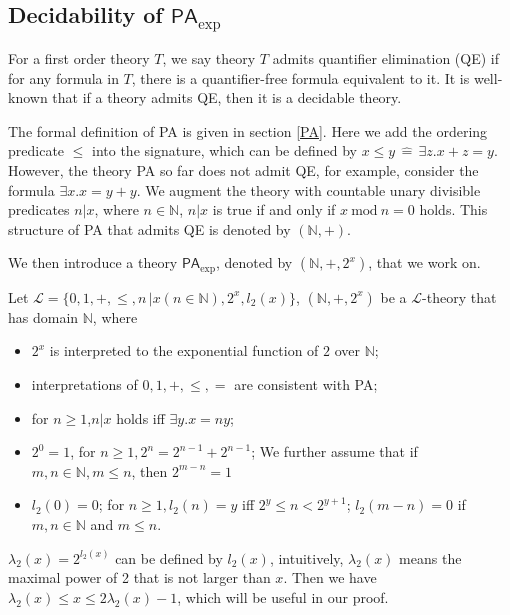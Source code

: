 \documentclass[runningheads]{llncs}
\newcommand{\paexp}{$\textsf{PA}_{\exp}$}
\newcommand{\Def}{\hat{=}}
\begin{document}
\subsection{Decidability of \paexp} \label{sec:3.2}

For a first order theory $T$,
we say theory $T$ admits quantifier elimination (QE) if for any formula in $T$, 
there is a quantifier-free formula equivalent to it.
It is well-known that if a theory admits QE, 
then it is a decidable theory.

The formal definition of PA is given in section \ref{PA}.
Here we add the ordering predicate $\le$ into the signature,
which can be defined by $x \le y\, \Def \, \exists z. x+z=y$.
However, the theory PA so far does not admit QE, 
for example, consider the formula $\exists x.x = y + y$. 
We augment the theory with countable unary divisible predicates
$n|x$, where $n\in \mathbb{N}$, 
$n|x$ is true if and only if $x\ \text{mod}\ n=0$ holds.
This structure of PA that admits QE is denoted by $(\mathbb{N},+)$.

We then introduce a theory {\paexp}, denoted by $(\mathbb{N},+,2^x)$, that we work on.
\begin{definition}
    Let $\mathcal{L}=\{0,1,+,\le,n \, |x(n\in \mathbb{N}),2^x,l_2(x)\}$, 
     $(\mathbb{N},+,2^x)$ be a $\mathcal{L}$-theory that has domain $\mathbb{N}$, where 
    \begin{itemize}
        \item  $2^x$ is interpreted to the exponential function of $2$ over $\mathbb{N}$; 
        \item interpretations of $0,1,+,\le,=$ are consistent with PA;
        \item for $n\ge 1$,$n|x$ holds iff $\exists y.x=ny$;
        \item $2^0=1$, for $n \ge 1, 2^n = 2^{n-1}+2^{n-1}$;
        We further assume that if $m,n\in \mathbb{N}, m\le n$, 
        then $2^{m-n} = 1$
        \item $l_2(0)=0$; for $n \ge 1,l_2(n) = y$ iff $2^y \le n < 2^{y+1}$;  $l_2(m-n) = 0$
        if $m,n\in \mathbb{N}$ and $m\le n$. 
    \end{itemize}
\end{definition}

$\lambda_2(x) = 2^{l_2(x)}$ can be defined by $l_2(x)$,
intuitively, $\lambda_2(x)$ means the maximal power of 2 that is not larger than $x$.
Then we have $\lambda_2(x) \le x \le 2\lambda_2(x)-1$,
which will be useful in our proof. 
\end{document}
